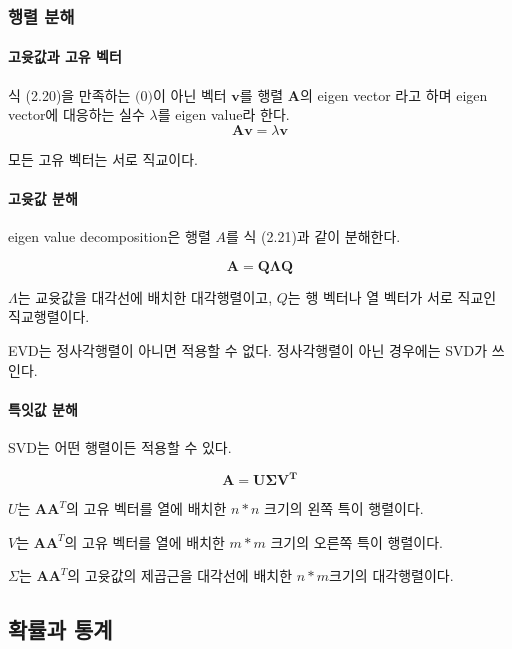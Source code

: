 \documentclass [12pt] {oblivoir}
\let\oldsubsubsection=\subsubsection
\renewcommand{\subsubsection}
{
  \filbreak
  \oldsubsubsection
}
\begin{document}
\subsubsection{행렬 분해}

\paragraph*{고윳값과 고유 벡터}\mbox{}

식 (2.20)을 만족하는 $\mathbf(0)$이 아닌 벡터 $\mathbf{v}$를 행렬 $\mathbf{A}$의 eigen vector 라고 하며 eigen vector에 대응하는 실수 $\lambda$를 eigen value라 한다.
\begin{equation} \tag{2.20}
  \mathbf{Av} = \lambda\mathbf{v}
\end{equation}

모든 고유 벡터는 서로 직교이다.

\paragraph*{고윳값 분해}\mbox{}

eigen value decomposition은 행렬 $A$를 식 (2.21)과 같이 분해한다.

\begin{equation} \tag{2.21}
  \mathbf{A = Q \Lambda Q}
\end{equation}

$\Lambda$는 교윳값을 대각선에 배치한 대각행렬이고, $Q$는 행 벡터나 열 벡터가 서로 직교인 직교행렬이다.

EVD는 정사각행렬이 아니면 적용할 수 없다. 정사각행렬이 아닌 경우에는 SVD가 쓰인다.

\paragraph*{특잇값 분해}\mbox{}

SVD는 어떤 행렬이든 적용할 수 있다.

\begin{equation} \tag{2.22}
  \mathbf{A = U \Sigma V^{T}}
\end{equation}

$U$는 $\mathbf{AA}^{T}$의 고유 벡터를 열에 배치한 $n*n$ 크기의 왼쪽 특이 행렬이다.

$V$는 $\mathbf{AA}^{T}$의 고유 벡터를 열에 배치한 $m*m$ 크기의 오른쪽 특이 행렬이다.

$\Sigma$는 $\mathbf{AA}^{T}$의 고윳값의 제곱근을 대각선에 배치한 $n*m$크기의 대각행렬이다.

\subsection{확률과 통계}
\end{document}
